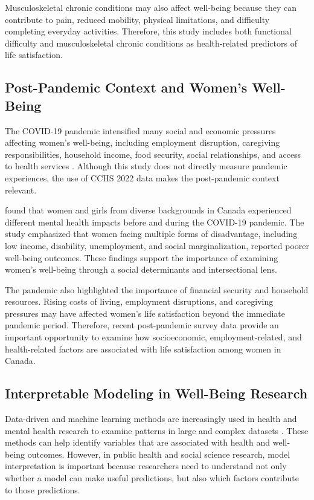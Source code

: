 \documentclass[12pt]{article}
\begin{document}
Musculoskeletal chronic conditions may also affect well-being because they can contribute to pain, reduced mobility, physical limitations, and difficulty completing everyday activities. Therefore, this study includes both functional difficulty and musculoskeletal chronic conditions as health-related predictors of life satisfaction.

\subsection{Post-Pandemic Context and Women’s Well-Being}

The COVID-19 pandemic intensified many social and economic pressures affecting women’s well-being, including employment disruption, caregiving responsibilities, household income, food security, social relationships, and access to health services \citep{park2024, bilodeau2025}. Although this study does not directly measure pandemic experiences, the use of CCHS 2022 data makes the post-pandemic context relevant.

\citet{park2024} found that women and girls from diverse backgrounds in Canada experienced different mental health impacts before and during the COVID-19 pandemic. The study emphasized that women facing multiple forms of disadvantage, including low income, disability, unemployment, and social marginalization, reported poorer well-being outcomes. These findings support the importance of examining women’s well-being through a social determinants and intersectional lens.

The pandemic also highlighted the importance of financial security and household resources. Rising costs of living, employment disruptions, and caregiving pressures may have affected women’s life satisfaction beyond the immediate pandemic period. Therefore, recent post-pandemic survey data provide an important opportunity to examine how socioeconomic, employment-related, and health-related factors are associated with life satisfaction among women in Canada.

\subsection{Interpretable Modeling in Well-Being Research}

Data-driven and machine learning methods are increasingly used in health and mental health research to examine patterns in large and complex datasets \citep{shatte2019}. These methods can help identify variables that are associated with health and well-being outcomes. However, in public health and social science research, model interpretation is important because researchers need to understand not only whether a model can make useful predictions, but also which factors contribute to those predictions.
\end{document}

